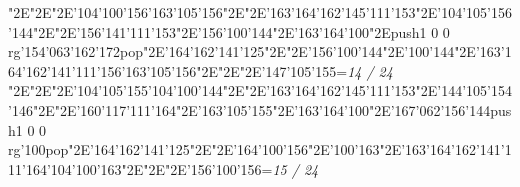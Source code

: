 \null\vfill\enskip\enskip\enskip\ipa\char"2E\enskip\enskip\enskip\ipa\char"2E\enskip\ipa\char"2E\ipa\char'104\ipa\char'100\ipa\char'156\bigskip\ipa\char'163\ipa\char'105\ipa\char'156\ipa\char"2E\enskip\enskip\enskip\ipa\char"2E\ipa\char'163\ipa\char'164\ipa\char'162\ipa\char'145\ipa\char'111\ipa\char'153\bigskip\enskip\enskip\ipa\char"2E\ipa\char'104\ipa\char'105\ipa\char'156\ipa\char'144\ipa\char"2E\enskip\ipa\char"2E\ipa\char'156\ipa\char'141\ipa\char'111\ipa\char'153\ipa\char"2E\ipa\char'156\ipa\char'100\ipa\char'144\ipa\char"2E\ipa\char'163\ipa\char'164\ipa\char'100\ipa\char"2E\pdfcolorstack\match push{1 0 0 rg}\ipa\char'154\ipa\char'063\ipa\char'162\ipa\char'172\pdfcolorstack\match pop{}\bigskip\enskip\ipa\char"2E\ipa\char'164\ipa\char'162\ipa\char'141\ipa\char'125\ipa\char"2E\enskip\enskip\ipa\char"2E\ipa\char'156\ipa\char'100\ipa\char'144\ipa\char"2E\ipa\char'100\ipa\char'144\ipa\char"2E\ipa\char'163\ipa\char'164\ipa\char'162\ipa\char'141\ipa\char'111\ipa\char'156\bigskip\ipa\char'163\ipa\char'105\ipa\char'156\ipa\char"2E\enskip\enskip\ipa\char"2E\enskip\enskip\enskip\ipa\char"2E\ipa\char'147\ipa\char'105\ipa\char'155\bigskip\vfill\footline={\hfill\tenrm\it 14 / 24}\eject
\null\vfill\enskip\enskip\enskip\ipa\char"2E\enskip\enskip\enskip\ipa\char"2E\enskip\ipa\char"2E\ipa\char'104\ipa\char'105\ipa\char'155\bigskip\ipa\char'104\ipa\char'100\ipa\char'144\ipa\char"2E\enskip\enskip\enskip\ipa\char"2E\ipa\char'163\ipa\char'164\ipa\char'162\ipa\char'145\ipa\char'111\ipa\char'153\bigskip\enskip\enskip\ipa\char"2E\ipa\char'144\ipa\char'105\ipa\char'154\ipa\char'146\ipa\char"2E\enskip\ipa\char"2E\ipa\char'160\ipa\char'117\ipa\char'111\ipa\char'164\ipa\char"2E\ipa\char'163\ipa\char'105\ipa\char'155\ipa\char"2E\ipa\char'163\ipa\char'164\ipa\char'100\ipa\char"2E\ipa\char'167\ipa\char'062\ipa\char'156\ipa\char'144\bigskip\pdfcolorstack\match push{1 0 0 rg}\ipa\char'100\pdfcolorstack\match pop{}\ipa\char"2E\ipa\char'164\ipa\char'162\ipa\char'141\ipa\char'125\ipa\char"2E\enskip\enskip\ipa\char"2E\ipa\char'164\ipa\char'100\ipa\char'156\ipa\char"2E\ipa\char'100\ipa\char'163\ipa\char"2E\ipa\char'163\ipa\char'164\ipa\char'162\ipa\char'141\ipa\char'111\ipa\char'164\bigskip\ipa\char'104\ipa\char'100\ipa\char'163\ipa\char"2E\enskip\enskip\ipa\char"2E\enskip\enskip\enskip\ipa\char"2E\ipa\char'156\ipa\char'100\ipa\char'156\bigskip\vfill\footline={\hfill\tenrm\it 15 / 24}\eject
